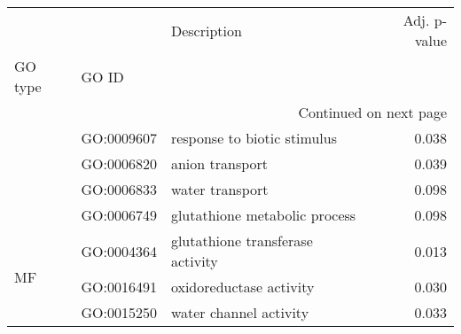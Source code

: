 \begin{longtable}{lllr}
\toprule
   &            &                       Description &  Adj. p-value \\
GO type & GO ID &                                   &               \\
\midrule
\endhead
\midrule
\multicolumn{4}{r}{{Continued on next page}} \\
\midrule
\endfoot

\bottomrule
\endlastfoot
\multirow{4}{*}{BP} & GO:0009607 &       response to biotic stimulus &         0.038 \\
   & GO:0006820 &                   anion transport &         0.039 \\
   & GO:0006833 &                   water transport &         0.098 \\
   & GO:0006749 &     glutathione metabolic process &         0.098 \\
\cline{1-4}
\multirow{3}{*}{MF} & GO:0004364 &  glutathione transferase activity &         0.013 \\
   & GO:0016491 &           oxidoreductase activity &         0.030 \\
   & GO:0015250 &            water channel activity &         0.033 \\
\end{longtable}
